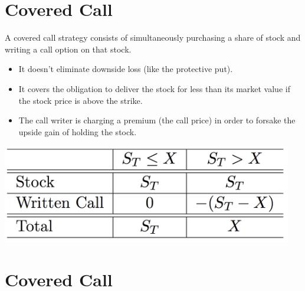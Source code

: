 \documentclass[letterpaper,10pt,english]{sphinxmanual}
\begin{document}
\section{Covered Call}
\label{options:covered-call}
A covered call strategy consists of simultaneously purchasing a share
of stock and writing a call option on that stock.
\begin{itemize}
\item {} 
It doesn't eliminate downside loss (like the protective put).

\end{itemize}
\begin{itemize}
\item {} 
It covers the obligation to deliver the stock for less than its
market value if the stock price is above the strike.

\end{itemize}
\begin{itemize}
\item {} 
The call writer is charging a premium (the call price) in order to
forsake the upside gain of holding the stock.

\end{itemize}

{\hfill\includegraphics[width=5in]{table4.png}\hfill}


\section{Covered Call}
\label{options:id21}
$\qquad$
\end{document}
